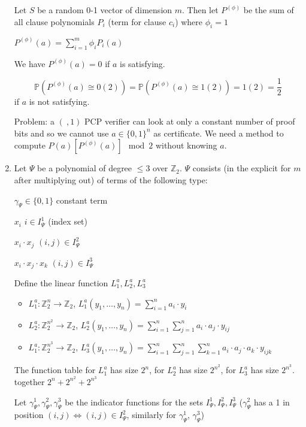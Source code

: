 \documentclass[11pt]{article}
\theoremstyle{definition}
\theoremstyle{definition}
\begin{document}
\begin{enumerate}
	Let $ S $ be a random 0-1 vector of dimension $ m $. Then let $ P^{(\phi)} $ be the sum of all clause polynomials $ P_i $ (term for clause $ c_i $) where $ \phi_i = 1 $
	
	$ P^{(\phi)} (a) = \sum \limits_{i = 1}^m \phi_i P_i(a) $
	
	We have $ P^{(\phi)} (a) = 0 $ if $ a $ is satisfying.
	
	\[ \mathbb{P}(P^{(\phi)} (a) \cong 0(2)) = \mathbb{P}(P^{(\phi)} (a) \cong 1(2)) = 1(2) = \frac{1}{2} \]
	if $ a $ is not satisfying.
	
	Problem: a $ (~, 1) $ PCP verifier can look at only a constant number of proof bits and so we cannot use $ a \in \{0, 1\}^n $ as certificate. We need a method to compute $ P(a) [P^{(\phi)}(a)] \mod 2 $ without knowing $ a $.
	
\item Let $ \Psi $ be a polynomial of degree $ \leq 3 $ over $ \mathbb{Z}_2 $. $ \Psi $ consists (in the explicit for $ m $ after multiplying out) of terms of the following type:

	$ \gamma_{\Psi} \in \{0, 1\} $ constant term
	
	$ x_i $ $ i \in I_{\Psi}^1 $ (index set)
	
	$ x_i \cdot x_j $ $ (i, j )\in I_{\Psi}^2 $
	
	$ x_i \cdot x_j \cdot x_k $ $ (i, j )\in I_{\Psi}^3 $
	
	Define the linear function $ L_1^a, L_2^a, L_3^a $
	\begin{itemize}
	\item $ L_1^a: \mathbb{Z}_2^n \rightarrow \mathbb{Z}_2 $, $ L_1^a (y_1, \dots, y_n) = \sum \limits_{i = 1}^n a_i \cdot y_i $
	\item $ L_2^a: \mathbb{Z}_2^{n^2} \rightarrow \mathbb{Z}_2 $, $ L_2^a (y_1, \dots, y_n) = \sum \limits_{i = 1}^n \sum \limits_{j = 1}^n a_i \cdot a_j \cdot y_{ij} $
	\item $ L_1^a: \mathbb{Z}_2^{n^3} \rightarrow \mathbb{Z}_2 $, $ L_3^a (y_1, \dots, y_n) = \sum \limits_{i = 1}^n \sum \limits_{j = 1}^n \sum \limits_{k = 1}^n a_i \cdot a_j \cdot a_k \cdot y_{i j k} $
	\end{itemize}
	
	The function table for $ L_1^a $ has size $ 2^n $, for $ L_2^a $ has size $ 2^{n^2} $, for $ L_3^a $ has size $ 2^{n^3} $. together $ 2^n + 2^{n^2} + 2^{n^3} $
	
	Let $ \gamma_{\Psi}^1, \gamma_{\Psi}^2, \gamma_{\Psi}^3 $ be the indicator functions for the sets $ I_{\Psi}^1, I_{\Psi}^2, I_{\Psi}^3 $ ($ \gamma_{\Psi}^2 $ has a 1 in position $ (i, j ) \Leftrightarrow (i, j) \in I_{\Psi}^2 $, similarly for $ \gamma_{\Psi}^1 $, $ \gamma_{\Psi}^3 $)
	

\end{enumerate}
\end{document}
